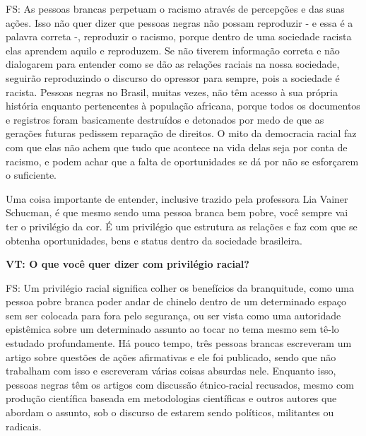 \documentclass[a4paper,
fontsize=11pt,
oneside,
numbers=noperiodatend,
parskip=half-,
bibliography=totoc,
final
]{scrartcl}
\begin{document}
FS: As pessoas brancas perpetuam o racismo através de percepções e das
suas ações. Isso não quer dizer que pessoas negras não possam reproduzir
- e essa é a palavra correta -, reproduzir o racismo, porque dentro de
uma sociedade racista elas aprendem aquilo e reproduzem. Se não tiverem
informação correta e não dialogarem para entender como se dão as
relações raciais na nossa sociedade, seguirão reproduzindo o discurso do
opressor para sempre, pois a sociedade é racista. Pessoas negras no
Brasil, muitas vezes, não têm acesso à sua própria história enquanto
pertencentes à população africana, porque todos os documentos e
registros foram basicamente destruídos e detonados por medo de que as
gerações futuras pedissem reparação de direitos. O mito da democracia
racial faz com que elas não achem que tudo que acontece na vida delas
seja por conta de racismo, e podem achar que a falta de oportunidades se
dá por não se esforçarem o suficiente.

Uma coisa importante de entender, inclusive trazido pela professora Lia
Vainer Schucman, é que mesmo sendo uma pessoa branca bem pobre, você
sempre vai ter o privilégio da cor. É um privilégio que estrutura as
relações e faz com que se obtenha oportunidades, bens e status dentro da
sociedade brasileira.

\textbf{VT: O que você quer dizer com privilégio racial?}

FS: Um privilégio racial significa colher os benefícios da branquitude,
como uma pessoa pobre branca poder andar de chinelo dentro de um
determinado espaço sem ser colocada para fora pelo segurança, ou ser
vista como uma autoridade epistêmica sobre um determinado assunto ao
tocar no tema mesmo sem tê-lo estudado profundamente. Há pouco tempo,
três pessoas brancas escreveram um artigo sobre questões de ações
afirmativas e ele foi publicado, sendo que não trabalham com isso e
escreveram várias coisas absurdas nele. Enquanto isso, pessoas negras
têm os artigos com discussão étnico-racial recusados, mesmo com produção
científica baseada em metodologias científicas e outros autores que
abordam o assunto, sob o discurso de estarem sendo políticos, militantes
ou radicais.
\end{document}
